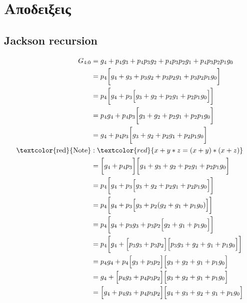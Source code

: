 \section{Αποδειξεις}

\subsection{Jackson recursion}
\begin{equation}
\begin{split}
    G_{4:0} &= g_4 + p_4    g_3 + p_4p_3g_2 + p_4p_3p_2g_1 + p_4p_3p_2p_1g_0 \\\
            &= p_4\bigg[g_4 + g_3 + p_3g_2 + p_3p_2g_1 + p_3p_2p_1g_0\bigg] \\
            &= p_4\bigg[g_4 + p_3\Big[ g_3 + g_2 + p_2g_1 + p_2p_1g_0\Big]\bigg] \\
            &= p_4g_4 + p_4p_3\bigg[ g_3 + g_2 + p_2g_1 + p_2p_1g_0\bigg] \\
            &= g_4 + p_4p_3\bigg[ g_3 + g_2 + p_2g_1 + p_2p_1g_0\bigg] \\
            \text{\textcolor{red}{Note}}&: \textcolor{red}{x+y*z=(x+y)*(x+z)}   \\
            &=\bigg[g_4 + p_4p_3\bigg]\bigg[g_4 + g_3 + g_2 + p_2g_1 + p_2p_1g_0\bigg] \\
            &= p_4\bigg[g_4 + p_3\Big[ g_3 + g_2 + p_2g_1 + p_2p_1g_0 \Big]\bigg] \\
            &= p_4\bigg[g_4 + p_3\Big[ g_3 + p_2( g_2 + g_1 + p_1g_0 )\Big]\bigg] \\
            &= p_4\bigg[g_4 + p_3g_3 + p_3p_2\Big[ g_2 + g_1 + p_1g_0 \Big]\bigg] \\  
            &= p_4\bigg[g_4 + \Big[ p_3g_3 + p_3p_2 \Big]\Big[ p_3g_3 + g_2 + g_1 + p_1g_0 \Big]    \bigg] \\
            &= p_4g_4 + p_4\Big[ g_3 + p_3p_2 \Big]\Big[ g_3 + g_2 + g_1 + p_1g_0 \Big]  \\
            &= g_4 + \Big[ p_4g_3 + p_4p_3p_2 \Big]\Big[ g_3 + g_2 + g_1 + p_1g_0 \Big]  \\ 
            &= \Big[g_4 +  p_4g_3 + p_4p_3p_2 \Big]\Big[ g_4 + g_3 + g_2 + g_1 + p_1g_0 \Big]
\end{split}
\end{equation}

